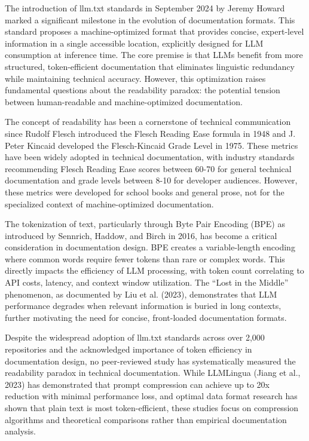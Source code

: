 \documentclass[10pt,conference,a4paper]{IEEEtran}
\begin{document}
The introduction of llm.txt standards in September 2024 by Jeremy Howard marked a significant milestone in the evolution of documentation formats. This standard proposes a machine-optimized format that provides concise, expert-level information in a single accessible location, explicitly designed for LLM consumption at inference time. The core premise is that LLMs benefit from more structured, token-efficient documentation that eliminates linguistic redundancy while maintaining technical accuracy. However, this optimization raises fundamental questions about the readability paradox: the potential tension between human-readable and machine-optimized documentation.

The concept of readability has been a cornerstone of technical communication since Rudolf Flesch introduced the Flesch Reading Ease formula in 1948 and J. Peter Kincaid developed the Flesch-Kincaid Grade Level in 1975. These metrics have been widely adopted in technical documentation, with industry standards recommending Flesch Reading Ease scores between 60-70 for general technical documentation and grade levels between 8-10 for developer audiences. However, these metrics were developed for school books and general prose, not for the specialized context of machine-optimized documentation.

The tokenization of text, particularly through Byte Pair Encoding (BPE) as introduced by Sennrich, Haddow, and Birch in 2016, has become a critical consideration in documentation design. BPE creates a variable-length encoding where common words require fewer tokens than rare or complex words. This directly impacts the efficiency of LLM processing, with token count correlating to API costs, latency, and context window utilization. The ``Lost in the Middle'' phenomenon, as documented by Liu et al. (2023), demonstrates that LLM performance degrades when relevant information is buried in long contexts, further motivating the need for concise, front-loaded documentation formats.

Despite the widespread adoption of llm.txt standards across over 2,000 repositories and the acknowledged importance of token efficiency in documentation design, no peer-reviewed study has systematically measured the readability paradox in technical documentation. While LLMLingua (Jiang et al., 2023) has demonstrated that prompt compression can achieve up to 20x reduction with minimal performance loss, and optimal data format research has shown that plain text is most token-efficient, these studies focus on compression algorithms and theoretical comparisons rather than empirical documentation analysis.
\end{document}
